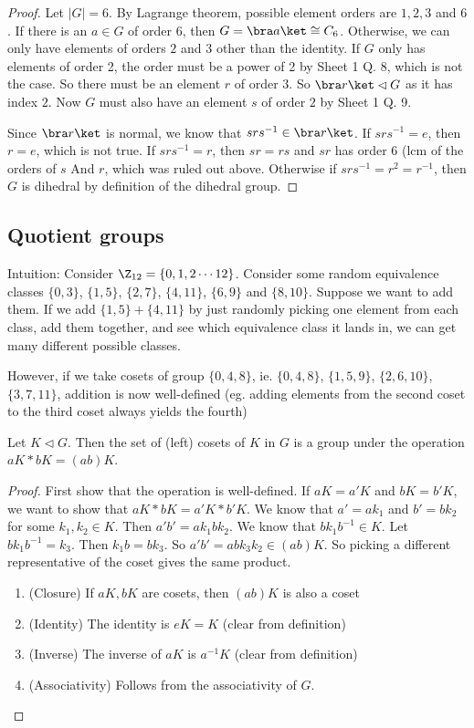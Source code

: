 \documentclass[a4paper]{article}
\begin{document}
\begin{proof}
  Let $|G| = 6$. By Lagrange theorem, possible element orders are $1, 2, 3$ and $6$. If there is an $a\in G$ of order $6$, then $G = \bra a\ket \cong C_6$. Otherwise, we can only have elements of orders $2$ and $3$ other than the identity. If $G$ only has elements of order 2, the order must be a power of 2 by Sheet 1 Q. 8, which is not the case. So there must be an element $r$ of order 3. So $\bra r\ket\lhd G$ as it has index $2$. Now $G$ must also have an element $s$ of order $2$ by Sheet 1 Q. 9.

  Since $\bra r\ket$ is normal, we know that $srs^{-1}\in \bra r\ket$. If $srs^{-1} = e$, then $r = e$, which is not true. If $srs^{-1} = r$, then $sr = rs$ and $sr$ has order $6$ (lcm of the orders of $s$ And $r$, which was ruled out above. Otherwise if $srs^{-1} = r^2 = r^{-1}$, then $G$ is dihedral by definition of the dihedral group.
\end{proof}

\subsection{Quotient groups}
Intuition: Consider $\Z_{12} = \{0, 1, 2\cdots 12\}$. Consider some random equivalence classes $\{0, 3\}$, $\{1, 5\}$, $\{2, 7\}$, $\{4, 11\}$, $\{6, 9\}$ and $\{8, 10\}$. Suppose we want to add them. If we add $\{1, 5\} + \{4, 11\}$ by just randomly picking one element from each class, add them together, and see which equivalence class it lands in, we can get many different possible classes.

However, if we take cosets of group $\{0, 4, 8\}$, ie. $\{0, 4, 8\}$, $\{1, 5, 9\}$, $\{2, 6, 10\}$, $\{3, 7, 11\}$, addition is now well-defined (eg. adding elements from the second coset to the third coset always yields the fourth)

\begin{prop}
  Let $K\lhd G$. Then the set of (left) cosets of $K$ in $G$ is a group under the operation $aK*bK = (ab)K$.
\end{prop}

\begin{proof}
  First show that the operation is well-defined. If $aK = a'K$ and $bK = b'K$, we want to show that $aK*bK = a'K * b'K$. We know that $a' = ak_1$ and $b' = bk_2$ for some $k_1, k_2\in K$. Then $a'b' = ak_1bk_2$. We know that $bk_1b^{-1}\in K$. Let $bk_1b^{-1} = k_3$. Then $k_1 b = bk_3$. So $a'b' = abk_3k_2\in (ab)K$. So picking a different representative of the coset gives the same product.
  \begin{enumerate}[label=\arabic{*}.]
    \item (Closure) If $aK, bK$ are cosets, then $(ab)K$ is also a coset
    \item (Identity) The identity is $eK = K$ (clear from definition)
    \item (Inverse) The inverse of $aK$ is $a^{-1}K$ (clear from definition)
    \item (Associativity) Follows from the associativity of $G$.
  \end{enumerate}
\end{proof}
\end{document}
